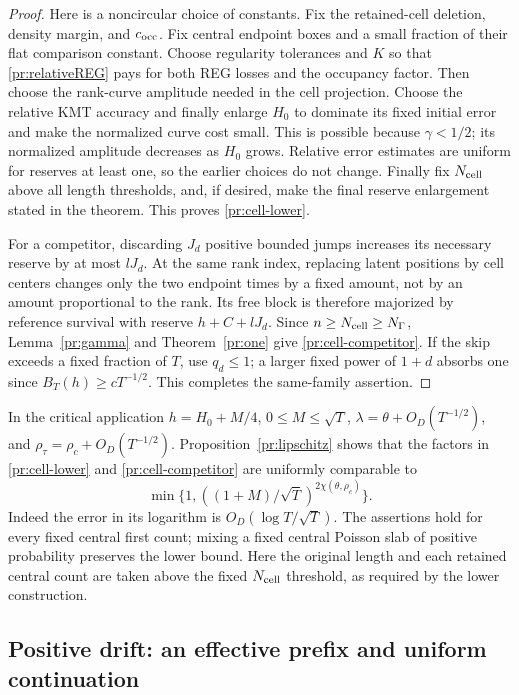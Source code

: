 \begin{proof}
Here is a noncircular choice of constants. Fix the retained-cell deletion,
density margin, and $c_{\rm occ}$. Fix central endpoint boxes and a small
fraction of their flat comparison constant. Choose regularity tolerances
and $K$ so that \eqref{pr:relativeREG} pays for both REG losses and the
occupancy factor. Then choose the rank-curve amplitude needed in the
cell projection. Choose the relative KMT accuracy and finally enlarge
$H_0$ to dominate its fixed initial error and make the normalized curve
cost small. This is possible because $\gamma<1/2$; its normalized
amplitude decreases as $H_0$ grows. Relative error estimates are uniform
for reserves at least one, so the earlier choices do not change.
Finally fix $N_{\rm cell}$ above all length thresholds, and, if desired,
make the final reserve enlargement stated in the theorem. This proves
\eqref{pr:cell-lower}.

For a competitor, discarding $J_d$ positive bounded jumps increases its
necessary reserve by at most $lJ_d$. At the same rank index, replacing
latent positions by cell centers changes only the two endpoint times
by a fixed amount, not by an amount proportional to the rank. Its free
block is therefore majorized by reference survival with reserve
$h+C+lJ_d$. Since $n\ge N_{\rm cell}\ge N_\Gamma$,
Lemma~\ref{pr:gamma} and Theorem~\ref{pr:one} give
\eqref{pr:cell-competitor}. If the skip exceeds a fixed fraction of $T$,
use $q_d\le1$; a larger fixed power of $1+d$ absorbs one since
$B_T(h)\ge cT^{-1/2}$. This completes the same-family assertion.
\end{proof}

In the critical application $h=H_0+M/4$, $0\le M\le\sqrt T$,
$\lambda=\theta+O_D(T^{-1/2})$, and
$\rho_\tau=\rho_c+O_D(T^{-1/2})$. Proposition~\ref{pr:lipschitz}
shows that the factors in \eqref{pr:cell-lower} and
\eqref{pr:cell-competitor} are uniformly comparable to
\[
 \min\{1,((1+M)/\sqrt T)^{2\chi(\theta,\rho_c)}\}.
\]
Indeed the error in its logarithm is $O_D(\log T/\sqrt T)$.
The assertions hold for every fixed central first count; mixing a fixed
central Poisson slab of positive probability preserves the lower bound.
Here the original length and each retained central count are taken above
the fixed $N_{\rm cell}$ threshold, as required by the lower construction.

\subsection{Positive drift: an effective prefix and uniform continuation}

